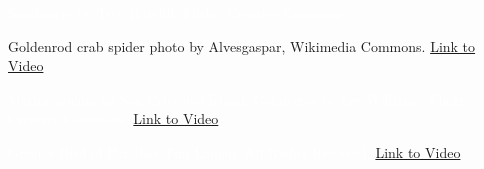 \documentclass[t]{beamer}
\begin{document}
{
\begin{frame}[t,plain]
\end{frame}
}

{
\begin{frame}[b,plain]
	\textcolor{white}{\tiny Sunflowers by Trey Ratcliff, Flickr, Creative Commons.}
\end{frame}
}

{
\begin{frame}[b,plain]
\tiny Goldenrod crab spider photo by Alvesgaspar, Wikimedia Commons.\hfill
\textcolor{white}{\href{https://www.youtube.com/watch?v=O9B_9XxZKJ8}{Link to Video}}
\end{frame}
}

{
\begin{frame}[b,plain]
	\tiny \textcolor{white}{Marine iguana on San Crist\'{o}bal Island, Galapagos by Les Williams, Flickr, Creative Commons.}\hfill
	\textcolor{white}{\href{https://www.youtube.com/watch?v=4tBWakZAGqU}{Link to Video}}
\end{frame}
}

{
\begin{frame}[b,plain]
	\tiny\textcolor{white}{Greater Bird of Paradise \textcopyright Tim Laman, All Rights Reserved. \hfill\href{http://www.youtube.com/watch?v=KIYkpwyKEhY}{Link to Video} }
\end{frame}
}

%
%
%
%
\end{document}
